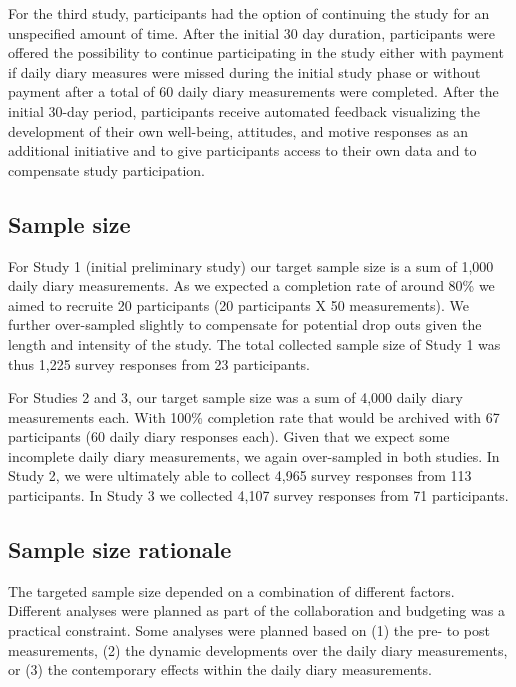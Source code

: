 \documentclass[]{article}
\begin{document}
For the third study, participants had the option of continuing the study
for an unspecified amount of time. After the initial 30 day duration,
participants were offered the possibility to continue participating in
the study either with payment if daily diary measures were missed during
the initial study phase or without payment after a total of 60 daily
diary measurements were completed. After the initial 30-day period,
participants receive automated feedback visualizing the development of
their own well-being, attitudes, and motive responses as an additional
initiative and to give participants access to their own data and to
compensate study participation.

\hypertarget{sample-size}{%
\subsection{Sample size}\label{sample-size}}

For Study 1 (initial preliminary study) our target sample size is a sum
of 1,000 daily diary measurements. As we expected a completion rate of
around 80\% we aimed to recruite 20 participants (20 participants X 50
measurements). We further over-sampled slightly to compensate for
potential drop outs given the length and intensity of the study. The
total collected sample size of Study 1 was thus 1,225 survey responses
from 23 participants.

For Studies 2 and 3, our target sample size was a sum of 4,000 daily
diary measurements each. With 100\% completion rate that would be
archived with 67 participants (60 daily diary responses each). Given
that we expect some incomplete daily diary measurements, we again
over-sampled in both studies. In Study 2, we were ultimately able to
collect 4,965 survey responses from 113 participants. In Study 3 we
collected 4,107 survey responses from 71 participants.

\hypertarget{sample-size-rationale}{%
\subsection{Sample size rationale}\label{sample-size-rationale}}

The targeted sample size depended on a combination of different factors.
Different analyses were planned as part of the collaboration and
budgeting was a practical constraint. Some analyses were planned based
on (1) the pre- to post measurements, (2) the dynamic developments over
the daily diary measurements, or (3) the contemporary effects within the
daily diary measurements.
\end{document}
